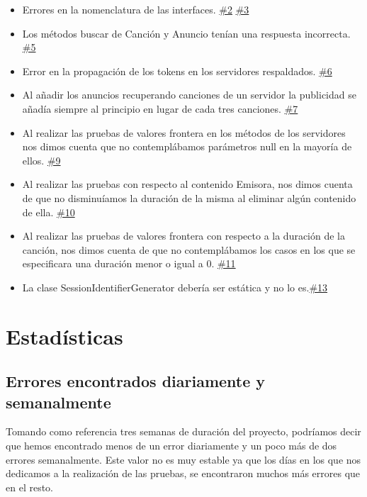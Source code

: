 \documentclass[DIV=calc,paper=a4,fontsize=11pt,onecolumn]{scrartcl}	 %
\begin{document}
\begin{itemize}
    \item{Errores en la nomenclatura de las interfaces. \href{https://github.com/andy135/PracticaVVS/issues/2}{\#2} \href{https://github.com/andy135/PracticaVVS/issues/3}{\#3}}
    \item{Los métodos buscar de Canción y Anuncio tenían una respuesta incorrecta. \href{https://github.com/andy135/PracticaVVS/issues/5}{\#5}}
    \item{Error en la propagación de los tokens en los servidores respaldados. \href{https://github.com/andy135/PracticaVVS/issues/6}{\#6}}
    \item{Al añadir los anuncios recuperando canciones de un servidor la publicidad se añadía siempre al principio en lugar de cada tres canciones. \href{https://github.com/andy135/PracticaVVS/issues/7}{\#7}}
    \item{Al realizar las pruebas de valores frontera en los métodos de los servidores nos dimos cuenta que no contemplábamos parámetros null en la mayoría de ellos. \href{https://github.com/andy135/PracticaVVS/issues/9}{\#9}}
    \item{Al realizar las pruebas con respecto al contenido Emisora, nos dimos cuenta de que no disminuíamos la duración de la misma al eliminar algún contenido de ella. \href{https://github.com/andy135/PracticaVVS/issues/10}{\#10}}
    \item{Al realizar las pruebas de valores frontera con respecto a la duración de la canción, nos dimos cuenta de que no contemplábamos los casos en los que se especificara una duración menor o igual a 0. \href{https://github.com/andy135/PracticaVVS/issues/11}{\#11}}     
    \item{La clase SessionIdentifierGenerator debería ser estática y no lo es.\href{https://github.com/andy135/PracticaVVS/issues/13}{\#13}}
\end{itemize}

\clearpage

\section{Estadísticas}  
  \subsection{Errores encontrados diariamente y semanalmente}
	Tomando como referencia tres semanas de duración del proyecto, podríamos decir que hemos encontrado menos de un error diariamente y un poco más de dos errores semanalmente. Este valor no es muy estable ya que los días en los que nos dedicamos a la realización de las pruebas, se encontraron muchos más errores que en el resto.
\end{document}

